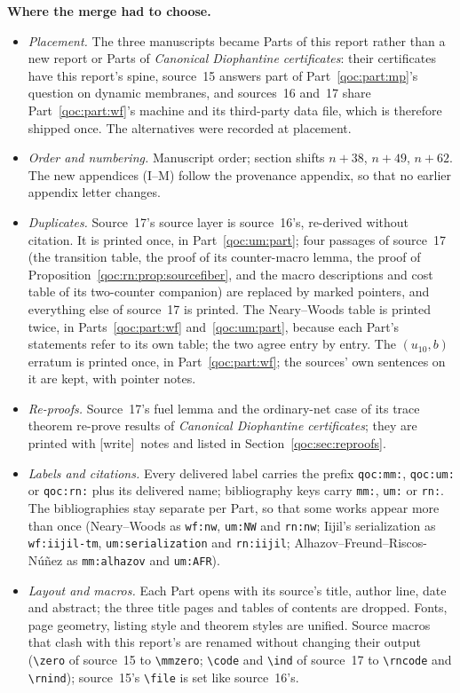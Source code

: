 \documentclass[11pt,letterpaper]{article}
\theoremstyle{definition}
\theoremstyle{remark}
\newcommand{\zero}{\mathbf 0}
\newcommand{\code}[1]{\nolinkurl{#1}}
\newcommand{\ind}[1]{\mathbf 1_{\{#1\}}}
\newcommand{\mmzero}{\boldsymbol 0}
\newcommand{\file}[1]{\nolinkurl{#1}}
\newcommand{\rncode}[1]{\texttt{#1}}
\newcommand{\rnind}{\mathbf 1}
\newcommand{\wtag}{\textup{[write]}}
\begin{document}
\textbf{Where the merge had to choose.}
\begin{itemize}
\item \emph{Placement.} The three manuscripts became Parts of this report rather than a new report or Parts of \emph{Canonical Diophantine certificates}: their certificates have this report's spine, source~15 answers part of Part~\ref{qoc:part:mp}'s question on dynamic membranes, and sources~16 and~17 share Part~\ref{qoc:part:wf}'s machine and its third-party data file, which is therefore shipped once. The alternatives were recorded at placement.
\item \emph{Order and numbering.} Manuscript order; section shifts $n+38$, $n+49$, $n+62$. The new appendices (I--M) follow the provenance appendix, so that no earlier appendix letter changes.
\item \emph{Duplicates.} Source~17's source layer is source~16's, re-derived without citation. It is printed once, in Part~\ref{qoc:um:part}; four passages of source~17 (the transition table, the proof of its counter-macro lemma, the proof of Proposition~\ref{qoc:rn:prop:sourcefiber}, and the macro descriptions and cost table of its two-counter companion) are replaced by marked pointers, and everything else of source~17 is printed. The Neary--Woods table is printed twice, in Parts~\ref{qoc:part:wf} and~\ref{qoc:um:part}, because each Part's statements refer to its own table; the two agree entry by entry. The $(u_{10},b)$ erratum is printed once, in Part~\ref{qoc:part:wf}; the sources' own sentences on it are kept, with pointer notes.
\item \emph{Re-proofs.} Source~17's fuel lemma and the ordinary-net case of its trace theorem re-prove results of \emph{Canonical Diophantine certificates}; they are printed with \wtag\ notes and listed in Section~\ref{qoc:sec:reproofs}.
\item \emph{Labels and citations.} Every delivered label carries the prefix \texttt{qoc:mm:}, \texttt{qoc:um:} or \texttt{qoc:rn:} plus its delivered name; bibliography keys carry \texttt{mm:}, \texttt{um:} or \texttt{rn:}. The bibliographies stay separate per Part, so that some works appear more than once (Neary--Woods as \texttt{wf:nw}, \texttt{um:NW} and \texttt{rn:nw}; Iijil's serialization as \texttt{wf:iijil-tm}, \texttt{um:serialization} and \texttt{rn:iijil}; Alhazov--Freund--Riscos-N\'u\~nez as \texttt{mm:alhazov} and \texttt{um:AFR}).
\item \emph{Layout and macros.} Each Part opens with its source's title, author line, date and abstract; the three title pages and tables of contents are dropped. Fonts, page geometry, listing style and theorem styles are unified. Source macros that clash with this report's are renamed without changing their output (\verb|\zero| of source~15 to \verb|\mmzero|; \verb|\code| and \verb|\ind| of source~17 to \verb|\rncode| and \verb|\rnind|); source~15's \verb|\file| is set like source~16's.

\end{itemize}
\end{document}
